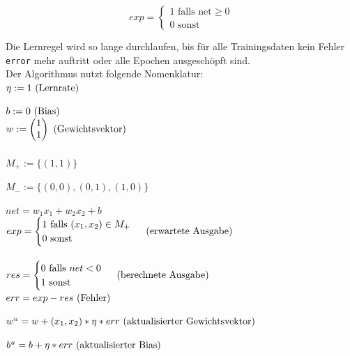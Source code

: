 \begin{equation}
exp = \begin{cases}
           1 \text{ falls } \text{net} \geq 0 \\
           0 \text{ sonst}
\end{cases}
\label{eq:gl-expnet}
\end{equation}

\noindent
Die Lernregel wird so lange durchlaufen, bis für alle Trainingsdaten kein Fehler \verb|error| mehr auftritt oder alle Epochen ausgeschöpft sind.\\

\noindent
Der Algorithmus nutzt folgende Nomenklatur:\\


$\eta := 1 \space \space \text{ (Lernrate)}$

$b := 0 \space \space \text{ (Bias)}$\\

$w := \begin{pmatrix}
          1 \\
          1
\end{pmatrix}\space \space \text{ (Gewichtsvektor)}$
\\
\\

$M_+ := \{(1, 1)\}$

$M_- := \{(0, 0), (0,1), (1,0)\}$

$net = w_1x_1 + w_2x_2 + b$\\

$exp = \begin{cases}
           1 \text{ falls } (x_1, x_2) \in M_+ \\
           0 \text{ sonst }
\end{cases}  \space \space \text{ (erwartete Ausgabe)}$
\\
\\

$res =  \begin{cases}
            0 \text{ falls } net < 0 \\
            1 \text{ sonst }
\end{cases}  \space \space \text{ (berechnete Ausgabe)}$\\

$err = exp - res  \space \space \text{ (Fehler)}$

$w^u = w + (x_1, x_2) * \eta * err  \space \space \text{ (aktualisierter Gewichtsvektor)}$

$b^u = b + \eta * err \space \space \text{ (aktualisierter Bias)}$\\


